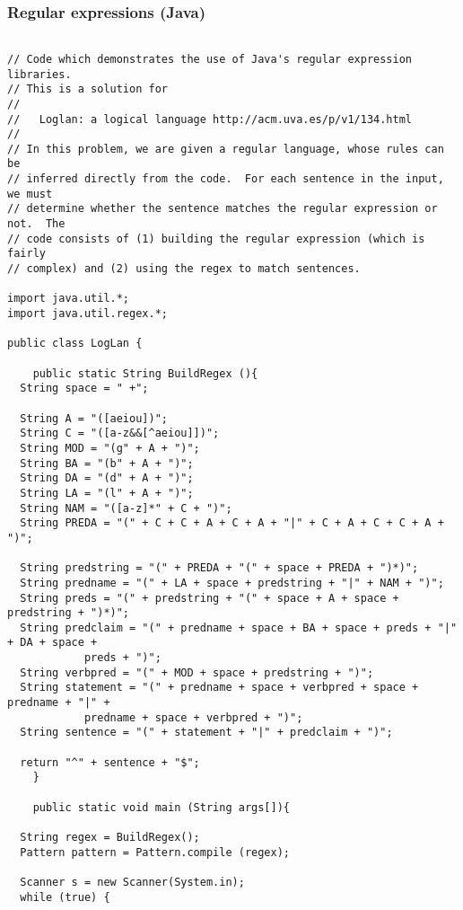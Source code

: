 \subsubsection{Regular expressions (Java)}
\begin{lstlisting}

// Code which demonstrates the use of Java's regular expression libraries.
// This is a solution for 
//
//   Loglan: a logical language http://acm.uva.es/p/v1/134.html
//
// In this problem, we are given a regular language, whose rules can be
// inferred directly from the code.  For each sentence in the input, we must
// determine whether the sentence matches the regular expression or not.  The
// code consists of (1) building the regular expression (which is fairly
// complex) and (2) using the regex to match sentences.

import java.util.*;
import java.util.regex.*;

public class LogLan {

    public static String BuildRegex (){
  String space = " +";

  String A = "([aeiou])";
  String C = "([a-z&&[^aeiou]])";
  String MOD = "(g" + A + ")";
  String BA = "(b" + A + ")";
  String DA = "(d" + A + ")";
  String LA = "(l" + A + ")";
  String NAM = "([a-z]*" + C + ")";
  String PREDA = "(" + C + C + A + C + A + "|" + C + A + C + C + A + ")";

  String predstring = "(" + PREDA + "(" + space + PREDA + ")*)";
  String predname = "(" + LA + space + predstring + "|" + NAM + ")";
  String preds = "(" + predstring + "(" + space + A + space + predstring + ")*)";
  String predclaim = "(" + predname + space + BA + space + preds + "|" + DA + space +
            preds + ")";
  String verbpred = "(" + MOD + space + predstring + ")";
  String statement = "(" + predname + space + verbpred + space + predname + "|" + 
            predname + space + verbpred + ")";
  String sentence = "(" + statement + "|" + predclaim + ")";

  return "^" + sentence + "$";
    }

    public static void main (String args[]){

  String regex = BuildRegex();
  Pattern pattern = Pattern.compile (regex);
  
  Scanner s = new Scanner(System.in);
  while (true) {


\end{lstlisting}
